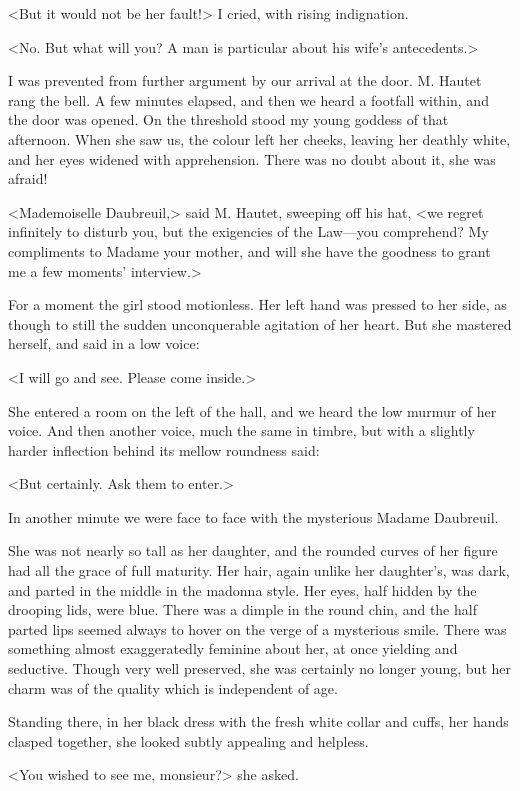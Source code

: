  <But it would not be her fault!> I cried, with rising indignation. 

 <No. But what will you? A man is particular about his wife's antecedents.> 

 I was prevented from further argument by our arrival at the door. M. Hautet rang the bell. A few minutes elapsed, and then we heard a footfall within, and the door was opened. On the threshold stood my young goddess of that afternoon. When she saw us, the colour left her cheeks, leaving her deathly white, and her eyes widened with apprehension. There was no doubt about it, she was afraid! 

 <Mademoiselle Daubreuil,> said M. Hautet, sweeping off his hat, <we regret infinitely to disturb you, but the exigencies of the Law—you comprehend? My compliments to Madame your mother, and will she have the goodness to grant me a few moments' interview.> 

 For a moment the girl stood motionless. Her left hand was pressed to her side, as though to still the sudden unconquerable agitation of her heart. But she mastered herself, and said in a low voice: 

 <I will go and see. Please come inside.> 

 She entered a room on the left of the hall, and we heard the low murmur of her voice. And then another voice, much the same in timbre, but with a slightly harder inflection behind its mellow roundness said: 

 <But certainly. Ask them to enter.> 

 In another minute we were face to face with the mysterious Madame Daubreuil. 

 She was not nearly so tall as her daughter, and the rounded curves of her figure had all the grace of full maturity. Her hair, again unlike her daughter's, was dark, and parted in the middle in the madonna style. Her eyes, half hidden by the drooping lids, were blue. There was a dimple in the round chin, and the half parted lips seemed always to hover on the verge of a mysterious smile. There was something almost exaggeratedly feminine about her, at once yielding and seductive. Though very well preserved, she was certainly no longer young, but her charm was of the quality which is independent of age. 

 Standing there, in her black dress with the fresh white collar and cuffs, her hands clasped together, she looked subtly appealing and helpless. 

 <You wished to see me, monsieur?> she asked. 

